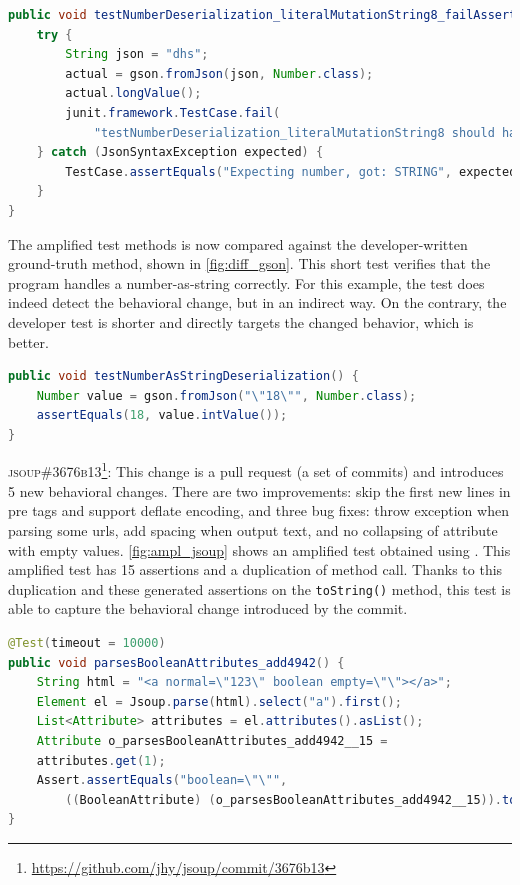 \begin{lstlisting}[language=java,caption=Test generated by DCI that detects the behavioral change of commit \textsc{44cad04} in Gson.,label=fig:ampl_gson]
public void testNumberDeserialization_literalMutationString8_failAssert0() throws Exception {
	try {
		String json = "dhs";
		actual = gson.fromJson(json, Number.class);
		actual.longValue();
		junit.framework.TestCase.fail(
			"testNumberDeserialization_literalMutationString8 should have thrown JsonSyntaxException");
	} catch (JsonSyntaxException expected) {
		TestCase.assertEquals("Expecting number, got: STRING", expected.getMessage());
	}
}
\end{lstlisting}
The amplified test methods is now compared against the developer-written ground-truth method, shown in \autoref{fig:diff_gson}. 
This short test verifies that the program handles a number-as-string correctly.
For this example, the \DCI test does indeed detect the behavioral change, but in an indirect way.
On the contrary, the developer test is shorter and directly targets the changed behavior, which is better.

\begin{lstlisting}[language=java,caption=Provided test by the developer for \textsc{44cad04} of Gson.,label=fig:diff_gson]
public void testNumberAsStringDeserialization() {
	Number value = gson.fromJson("\"18\"", Number.class);
	assertEquals(18, value.intValue());
}
\end{lstlisting}

\textsc{jsoup\#3676b13}\footnote{\url{https://github.com/jhy/jsoup/commit/3676b13}}: This change is a pull request (\ie a set of commits) and introduces 5 new behavioral changes.
There are two improvements: skip the first new lines in pre tags and support deflate encoding, and three bug fixes: throw exception when parsing some urls, add spacing when output text, and no collapsing of attribute with empty values.
\autoref{fig:ampl_jsoup} shows an amplified test obtained using \DCII.
This amplified test has 15 assertions and a duplication of method call.
Thanks to this duplication and these generated assertions on the \texttt{toString()} method, this test is able to capture the behavioral change introduced by the commit.

\begin{lstlisting}[language=java,caption=Test generated by \DCII that detects the behavioral change of \textsc{3676b13} of Jsoup.,label=fig:ampl_jsoup]
@Test(timeout = 10000)
public void parsesBooleanAttributes_add4942() {
	String html = "<a normal=\"123\" boolean empty=\"\"></a>";
	Element el = Jsoup.parse(html).select("a").first();
	List<Attribute> attributes = el.attributes().asList();
	Attribute o_parsesBooleanAttributes_add4942__15 = 
	attributes.get(1);
	Assert.assertEquals("boolean=\"\"", 
		((BooleanAttribute) (o_parsesBooleanAttributes_add4942__15)).toString());
}
\end{lstlisting}

